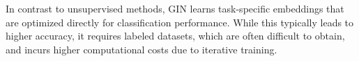In contrast to unsupervised methods, GIN learns task-specific embeddings that are optimized directly for classification performance. 
While this typically leads to higher accuracy, it requires labeled datasets, which are often difficult to obtain, 
and incurs higher computational costs due to iterative training.






